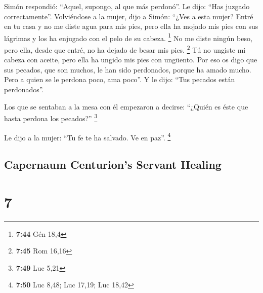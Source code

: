 \begin{paracol}{2}
 Simón respondió: ``Aquel, supongo, al que más perdonó''.
Le dijo: ``Has juzgado correctamente''.  Volviéndose a la
mujer, dijo a Simón: ``¿Ves a esta mujer? Entré en tu casa y no me diste
agua para mis pies, pero ella ha mojado mis pies con sus lágrimas y los
ha enjugado con el pelo de su cabeza. \footnote{\textbf{7:44} Gén 18,4}
 No me diste ningún beso, pero ella, desde que entré, no
ha dejado de besar mis pies. \footnote{\textbf{7:45} Rom 16,16}
 Tú no ungiste mi cabeza con aceite, pero ella ha ungido
mis pies con ungüento.  Por eso os digo que sus pecados,
que son muchos, le han sido perdonados, porque ha amado mucho. Pero a
quien se le perdona poco, ama poco''.  Y le dijo: ``Tus
pecados están perdonados''.

 Los que se sentaban a la mesa con él empezaron a
decirse: ``¿Quién es éste que hasta perdona los pecados?'' \footnote{\textbf{7:49}
  Luc 5,21}

 Le dijo a la mujer: ``Tu fe te ha salvado. Ve en paz''.
\footnote{\textbf{7:50} Luc 8,48; Luc 17,19; Luc 18,42}

\switchcolumn
\begin{otherlanguage}{english}

\hypertarget{capernaum-centurions-servant-healing}{%
\subsection{Capernaum Centurion's Servant
Healing}\label{capernaum-centurions-servant-healing}}

\hypertarget{section-13}{%
\section{7}\label{section-13}}


\end{otherlanguage}
\end{paracol}
